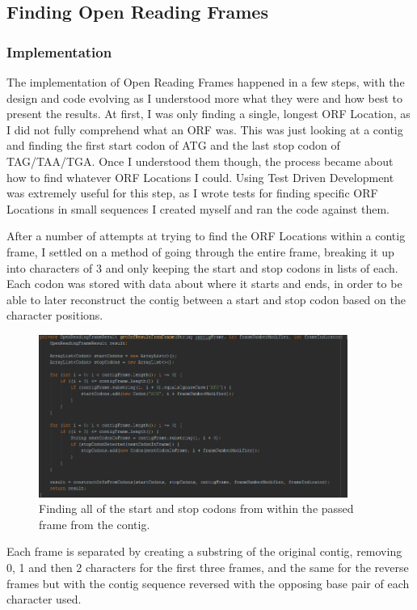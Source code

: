 \subsection{Finding Open Reading Frames}
\subsubsection{Implementation}
The implementation of Open Reading Frames happened in a few steps, with the design and code evolving as I understood more what they were and how best to present the results. At first, I was only finding a single, longest ORF Location, as I did not fully comprehend what an ORF was. This was just looking at a contig and finding the first start codon of ATG and the last stop codon of TAG/TAA/TGA. Once I understood them though, the process became about how to find whatever ORF Locations I could. Using Test Driven Development was extremely useful for this step, as I wrote tests for finding specific ORF Locations in small sequences I created myself and ran the code against them.

After a number of attempts at trying to find the ORF Locations within a contig frame, I settled on a method of going through the entire frame, breaking it up into characters of 3 and only keeping the start and stop codons in lists of each. Each codon was stored with data about where it starts and ends, in order to be able to later reconstruct the contig between a start and stop codon based on the character positions.

\begin{figure}[H]
\centering
\includegraphics[width=0.9\textwidth]{images/orffind2}
\caption{Finding all of the start and stop codons from within the passed frame from the contig.}
\end{figure}


Each frame is separated by creating a substring of the original contig, removing 0, 1 and then 2 characters for the first three frames, and the same for the reverse frames but with the contig sequence reversed with the opposing base pair of each character used. 

